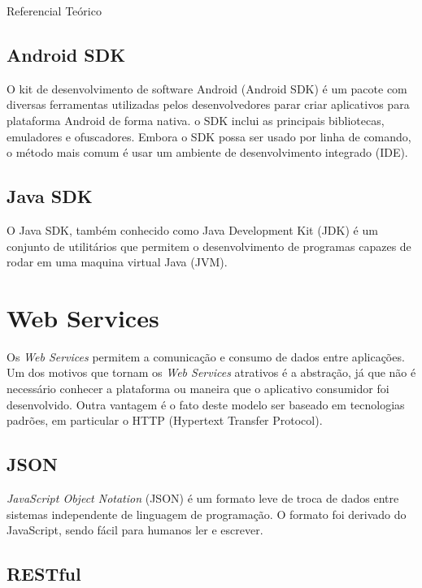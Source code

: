 \documentclass[
	12pt,				%
	openright,			%
	twoside,			%
	a4paper,			%
	english,			%
	french,				%
	spanish,			%
	brazil				%
	]{abntex2}
\begin{document}
\begin{chapter}{Referencial Teórico}
\subsection{Android SDK}
O kit de desenvolvimento de software Android (Android SDK) é um pacote com diversas ferramentas utilizadas pelos desenvolvedores parar criar aplicativos para plataforma Android de forma nativa. o SDK inclui as principais bibliotecas, emuladores e ofuscadores.
Embora o SDK possa ser usado por linha de comando, o método mais comum é usar um ambiente de desenvolvimento integrado (IDE). 
\subsection{Java SDK}
O Java SDK, também conhecido como Java Development Kit (JDK) é um conjunto de utilitários que permitem o desenvolvimento de programas capazes de rodar em uma maquina virtual Java (JVM).
\section{Web Services}
Os \textit{Web Services} permitem a comunicação e consumo de dados entre aplicações. Um dos motivos que tornam os \textit{Web Services} atrativos é a abstração, já que não é necessário conhecer a plataforma ou maneira que o aplicativo consumidor foi desenvolvido. Outra vantagem é o fato deste modelo ser baseado em tecnologias padrões, em particular o HTTP (Hypertext Transfer Protocol).
\subsection{JSON}
\textit{JavaScript Object Notation} (JSON) é um formato leve de troca de dados entre sistemas independente de linguagem de programação. O formato foi derivado do JavaScript, sendo fácil para humanos ler e escrever.
\subsection{RESTful}
\end{chapter}
\end{document}
